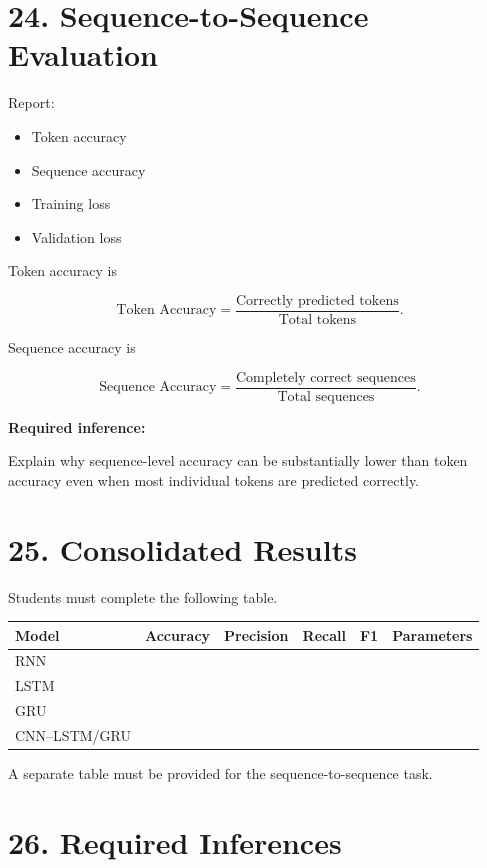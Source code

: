 \documentclass[10pt]{article}
\begin{document}
\section*{24. Sequence-to-Sequence Evaluation}

Report:

\begin{itemize}
\item Token accuracy
\item Sequence accuracy
\item Training loss
\item Validation loss
\end{itemize}

Token accuracy is

\[
\text{Token Accuracy}
=
\frac{\text{Correctly predicted tokens}}
{\text{Total tokens}}.
\]

Sequence accuracy is

\[
\text{Sequence Accuracy}
=
\frac{\text{Completely correct sequences}}
{\text{Total sequences}}.
\]

\textbf{Required inference:}

Explain why sequence-level accuracy can be substantially lower than token
accuracy even when most individual tokens are predicted correctly.

\section*{25. Consolidated Results}

Students must complete the following table.

\begin{center}
\begin{tabular}{|l|c|c|c|c|c|}
\hline
Model & Accuracy & Precision & Recall & F1 & Parameters\\
\hline
RNN & & & & &\\
LSTM & & & & &\\
GRU & & & & &\\
CNN--LSTM/GRU & & & & &\\
\hline
\end{tabular}
\end{center}

A separate table must be provided for the sequence-to-sequence task.

\section*{26. Required Inferences}
\end{document}
